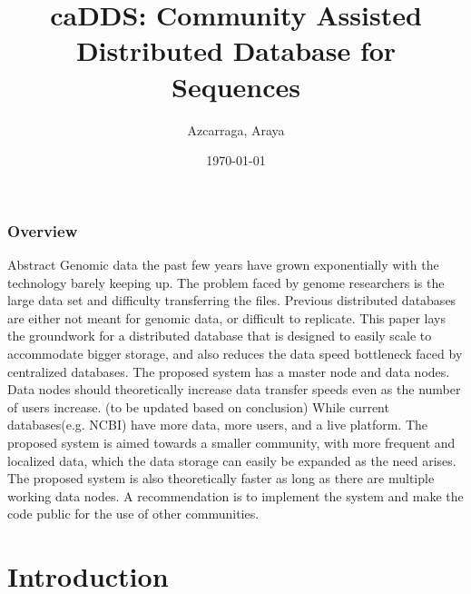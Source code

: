 \documentclass{beamer}
\title[caDDS]{caDDS: Community Assisted Distributed Database for Sequences}
\author{Azcarraga, Araya} %
\institute[Department of Computer Science, University of the Philippine - Diliman] %
{
University of the Philippine - Diliman\\ %
\medskip
}
\date{\today} %
\begin{document}
\begin{frame}
\titlepage %
\end{frame}


\begin{frame}
\frametitle{Overview} %
\tableofcontents %
\end{frame}

\begin{frame}{Abstract}
Genomic data the past few years have grown exponentially with the technology barely keeping up. The problem faced by genome researchers is the large data set and difficulty transferring the files. Previous distributed databases are either not meant for genomic data, or difficult to replicate. This paper lays the groundwork for a distributed database that is designed to easily scale to accommodate bigger storage, and also reduces the data speed bottleneck faced by centralized databases. The proposed system has a master node and data nodes. Data nodes should theoretically increase data transfer speeds even as the number of users increase. (to be updated based on conclusion) While current databases(e.g. NCBI) have more data, more users, and a live platform. The proposed system is aimed towards a smaller community, with more frequent and localized data, which the data storage can easily be expanded as the need arises. The proposed system is also theoretically faster as long as there are multiple working data nodes. A recommendation is to implement the system and make the code public for the use of other communities.
\end{frame}
\section{Introduction}
\end{document}
